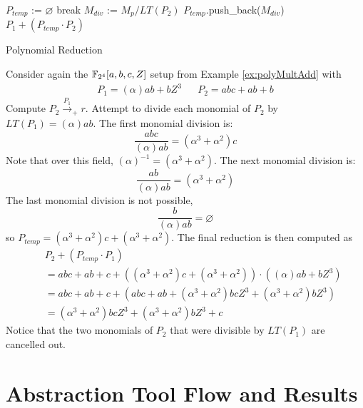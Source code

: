 \begin{algorithm}[hbt]
\SetAlgoNoLine
        $P_{temp}$ := $\varnothing$\;
        {
            {
                break\;
            }
            $M_{div}$ := $M_p / LT(P_2)$\;
            {
                $P_{temp}$.push\_back($M_{div}$)\;
            }
        }
        \Return $P_1 + (P_{temp} \cdot P_2)$\;
\caption{Polynomial Reduction}\label{alg:polyReduction}
\end{algorithm}

\begin{Example}
Consider again the ${\mathbb{F}}_{2^4}[a,b,c,Z]$ setup from Example \ref{ex:polyMultAdd} 
with
\begin{eqnarray}
P_1=(\alpha) ab +bZ^3 && P_2=abc+ab+b
\end{eqnarray}
Compute $P_2\stackrel{P_1}{\textstyle\longrightarrow}_+ r$. Attempt to divide 
each monomial of $P_2$ by $LT(P_1)=(\alpha)ab$.
The first monomial
division is:
\begin{equation}
\frac{abc}{(\alpha)ab} = (\alpha^3+\alpha^2)c
\end{equation}
Note that over this field, $(\alpha)^{-1}=(\alpha^3+\alpha^2)$.
The next monomial division is:
\begin{equation}
\frac{ab}{(\alpha)ab} = (\alpha^3+\alpha^2)
\end{equation}
The last monomial division is not possible,
\begin{equation}
\frac{b}{(\alpha)ab} = \varnothing
\end{equation}
so $P_{temp}=(\alpha^3+\alpha^2)c+(\alpha^3+\alpha^2)$. The final reduction
is then computed as
\begin{eqnarray}
&&P_2 + (P_{temp} \cdot P_1) \nonumber \\
&&= abc+ab+c+((\alpha^3+\alpha^2)c+(\alpha^3+\alpha^2))\cdot((\alpha) ab +bZ^3) \nonumber \\
&&=abc+ab+c+(abc+ab+(\alpha^3+\alpha^2)bcZ^3+(\alpha^3+\alpha^2)bZ^3) \nonumber \\
&&=(\alpha^3+\alpha^2)bcZ^3+(\alpha^3+\alpha^2)bZ^3+c 
\end{eqnarray}
Notice that the two monomials of $P_2$ that were divisible by $LT(P_1)$ are 
cancelled out.
\end{Example}

\section{Abstraction Tool Flow and Results}


